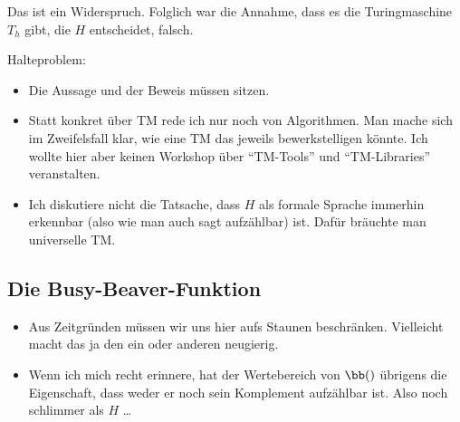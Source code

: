 \begin{beweis}
  Das ist ein Widerspruch. Folglich war die Annahme, dass es die
  Turingmaschine $T_h$ gibt, die $H$ entscheidet, falsch.
\end{beweis}

\begin{tutorium}
  Halteproblem:
  \begin{itemize}
  \item Die Aussage und der Beweis müssen sitzen.
  \item Statt konkret über TM rede ich nur noch von Algorithmen. Man
    mache sich im Zweifelsfall klar, wie eine TM das jeweils
    bewerkstelligen könnte.  Ich wollte hier aber keinen Workshop
    über "`TM-Tools"' und "`TM-Libraries"' veranstalten.
  \item Ich diskutiere nicht die Tatsache, dass $H$ als formale
    Sprache immerhin erkennbar (also wie man auch sagt aufzählbar)
    ist. Dafür bräuchte man universelle TM.
  \end{itemize}
\end{tutorium}

\Tut\subsection{Die Busy-Beaver-Funktion}
\label{subsec:busy-beaver}

\begin{tutorium}
  \begin{itemize}
  \item Aus Zeitgründen müssen wir uns hier aufs Staunen
    beschränken. Vielleicht macht das ja den ein oder anderen
    neugierig.
  \item Wenn ich mich recht erinnere, hat der Wertebereich von
    $\bb()$ übrigens die Eigenschaft, dass weder er noch sein
    Komplement aufzählbar ist. Also noch schlimmer als $H$ \dots
  \end{itemize}
\end{tutorium}

